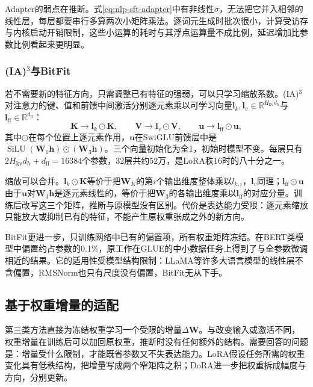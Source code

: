 Adapter的弱点在推断。式\eqref{eq:nlp-sft-adapter}中有非线性$\sigma$，无法把它并入相邻的线性层，每层都要串行多算两次小矩阵乘法。逐词元生成时批次很小，计算受访存与内核启动开销限制，这些小运算的耗时与其浮点运算量不成比例，延迟增加比参数比例看起来更明显。

\subsubsection{\texorpdfstring{(IA)$^3$}{(IA)3}与BitFit}
\label{sec:nlp-sft-ia3-bitfit}

若不需要新的特征方向，只需调整已有特征的强弱，可以只学习缩放系数。(IA)$^3$对注意力的键、值和前馈中间激活分别逐元素乘以可学习向量$\bm l_k,\bm l_v\in\mathbb R^{H_{\mathrm{kv}}d_h}$与$\bm l_{\mathrm{ff}}\in\mathbb R^{d_{\mathrm{ff}}}$\cite{nlp-sft-liu2022ia3}：
\[
 \bm K\to\bm l_k\odot\bm K,\qquad
 \bm V\to\bm l_v\odot\bm V,\qquad
 \bm u\to\bm l_{\mathrm{ff}}\odot\bm u,
\]
其中$\odot$在每个位置上逐元素作用，$\bm u$在SwiGLU前馈层中是$\operatorname{SiLU}(\bm W_1\bm h)\odot(\bm W_3\bm h)$。三个向量初始化为全1，初始时模型不变。每层只有$2H_{\mathrm{kv}}d_h+d_{\mathrm{ff}}=16384$个参数，32层共约52万，是LoRA秩16时的八十分之一。

缩放可以合并。$\bm l_k\odot\bm K$等价于把$\bm W_K$的第$i$个输出维度整体乘以$l_{k,i}$，$\bm l_v$同理；$\bm l_{\mathrm{ff}}\odot\bm u$由于$\bm u$对$\bm W_3\bm h$是逐元素线性的，等价于把$\bm W_3$的各输出维度乘以$\bm l_{\mathrm{ff}}$的对应分量。训练后改写这三个矩阵，推断与原模型没有区别。代价是表达能力受限：逐元素缩放只能放大或抑制已有的特征，不能产生原权重张成之外的新方向。

BitFit更进一步，只训练网络中已有的偏置项，所有权重矩阵冻结。在BERT类模型中偏置约占参数的0.1\%，原工作在GLUE的中小数据任务上得到了与全参数微调相近的结果。它的适用性受模型结构限制：LLaMA等许多大语言模型的线性层不含偏置，RMSNorm也只有尺度没有偏置，BitFit无从下手。

\subsection{基于权重增量的适配}
\label{sec:nlp-sft-weight-delta}

第三类方法直接为冻结权重学习一个受限的增量$\Delta\bm W$。与改变输入或激活不同，权重增量在训练后可以加回原权重，推断时没有任何额外的结构。需要回答的问题是：增量受什么限制，才能既省参数又不失表达能力。LoRA假设任务所需的权重变化具有低秩结构，把增量写成两个窄矩阵之积；DoRA进一步把权重拆成幅度与方向，分别更新。

